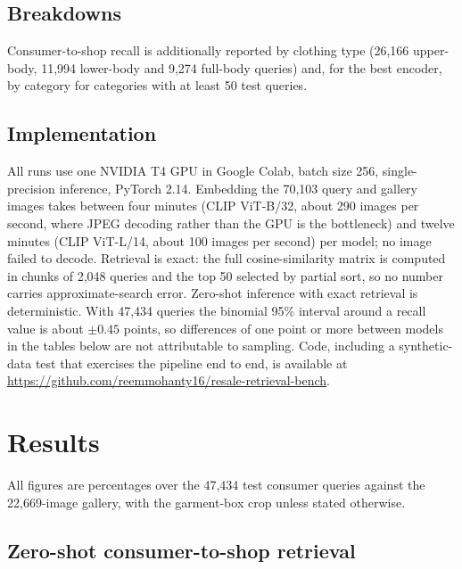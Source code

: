 \documentclass[10pt,twocolumn,letterpaper]{article}
\begin{document}
\subsection{Breakdowns}
Consumer-to-shop recall is additionally reported by clothing type (26,166 upper-body, 11,994 lower-body and 9,274 full-body queries) and, for the best encoder, by category for categories with at least 50 test queries.

\subsection{Implementation}
All runs use one NVIDIA T4 GPU in Google Colab, batch size 256, single-precision inference, PyTorch 2.14. Embedding the 70,103 query and gallery images takes between four minutes (CLIP ViT-B/32, about 290 images per second, where JPEG decoding rather than the GPU is the bottleneck) and twelve minutes (CLIP ViT-L/14, about 100 images per second) per model; no image failed to decode. Retrieval is exact: the full cosine-similarity matrix is computed in chunks of 2,048 queries and the top 50 selected by partial sort, so no number carries approximate-search error. Zero-shot inference with exact retrieval is deterministic. With 47,434 queries the binomial 95\% interval around a recall value is about $\pm 0.45$ points, so differences of one point or more between models in the tables below are not attributable to sampling. Code, including a synthetic-data test that exercises the pipeline end to end, is available at \url{https://github.com/reemmohanty16/resale-retrieval-bench}.

\section{Results}
\label{sec:results}

All figures are percentages over the 47,434 test consumer queries against the 22,669-image gallery, with the garment-box crop unless stated otherwise.

\subsection{Zero-shot consumer-to-shop retrieval}
\end{document}
